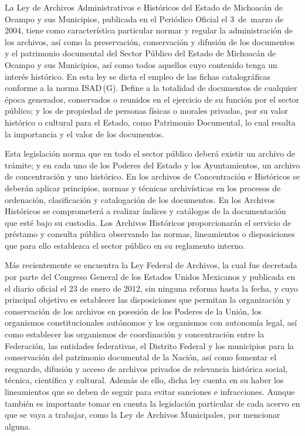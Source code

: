 \enlargethispage{1\baselineskip}
La Ley de Archivos Administrativos e Históricos del Estado de Michoacán 
de Ocampo y sus Municipios, publicada en el Periódico Oficial el 3~de~marzo 
de 2004, tiene como característica particular normar y regular 
la administración de los archivos, así como la preservación, 
conservación y difusión de los documentos y el patrimonio documental 
del Sector Público del Estado de Michoacán de Ocampo y sus Municipios, 
así como todos aquellos cuyo contenido tenga un interés histórico. En esta ley 
se dicta el empleo de las fichas catalográficas conforme a la 
norma ISAD\,(G). Define a la totalidad de documentos de cualquier época 
generados, conservados o reunidos en el ejercicio de su función por el 
sector público; y los de propiedad de personas físicas o morales 
privadas, por su valor histórico o cultural para el Estado, como 
Patrimonio Documental, lo cual resalta la importancia y el valor de los 
documentos.

Esta legislación norma que en todo el sector público deberá existir un 
archivo de trámite; y en cada uno de los Poderes del Estado y los 
Ayuntamientos, un archivo de concentración y uno histórico. En los 
archivos de Concentración e Históricos se deberán aplicar principios, 
normas y técnicas archivísticas en los procesos de ordenación, 
clasificación y catalogación de los documentos. En los Archivos 
Históricos se comprometerá a realizar índices y catálogos de la 
documentación que esté bajo su custodia. Los Archivos Históricos 
proporcionarán el servicio de préstamo y consulta pública observando 
las normas, lineamientos o disposiciones que para ello establezca el 
sector público en su reglamento interno.

Más recientemente se encuentra la Ley Federal de Archivos, la cual fue 
decretada por parte del Congreso General de los Estados Unidos 
Mexicanos y publicada en el diario oficial el 23 de enero de 2012, sin 
ninguna reforma hasta la fecha, y cuyo principal objetivo es establecer 
las disposiciones que permitan la organización y conservación de los 
archivos en posesión de los Poderes de la Unión, los organismos 
constitucionales autónomos y los organismos con autonomía legal, así 
como establecer los organismos de coordinación y concentración entre la 
Federación, las entidades federativas, el Distrito Federal y los 
municipios para la conservación del patrimonio documental de la Nación, 
así como fomentar el resguardo, difusión y acceso de archivos privados 
de relevancia histórica social, técnica, científica y cultural. Además 
de ello, dicha ley cuenta en su haber los lineamientos que se deben de 
seguir para evitar sanciones e infracciones. Aunque también es 
importante tomar en cuenta la legislación particular de cada acervo en 
que se vaya a trabajar, como la Ley de Archivos Municipales, por mencionar 
alguna.

